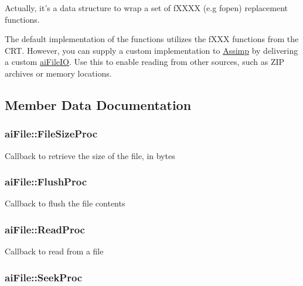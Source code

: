 Actually, it's a data structure to wrap a set of f\-X\-X\-X\-X (e.\-g fopen) replacement functions.

The default implementation of the functions utilizes the f\-X\-X\-X functions from the C\-R\-T. However, you can supply a custom implementation to \hyperlink{namespace_assimp}{Assimp} by delivering a custom \hyperlink{structai_file_i_o}{ai\-File\-I\-O}. Use this to enable reading from other sources, such as Z\-I\-P archives or memory locations. 

\subsection{Member Data Documentation}
\hypertarget{structai_file_aff2fff8c0458e7ec71f7de217c3a3033}{
\subsubsection[{File\-Size\-Proc}]{ ai\-File\-::\-File\-Size\-Proc}}\label{structai_file_aff2fff8c0458e7ec71f7de217c3a3033}
Callback to retrieve the size of the file, in bytes \hypertarget{structai_file_a1102d28d1c0be68ffed20476669bdb0d}{
\subsubsection[{Flush\-Proc}]{ ai\-File\-::\-Flush\-Proc}}\label{structai_file_a1102d28d1c0be68ffed20476669bdb0d}
Callback to flush the file contents \hypertarget{structai_file_a52287e81ca67b9d43cc1ce6142f781fa}{
\subsubsection[{Read\-Proc}]{ ai\-File\-::\-Read\-Proc}}\label{structai_file_a52287e81ca67b9d43cc1ce6142f781fa}
Callback to read from a file \hypertarget{structai_file_a7a07b499be4ad433669246479a4d4ad2}{
\subsubsection[{Seek\-Proc}]{ ai\-File\-::\-Seek\-Proc}}\label{structai_file_a7a07b499be4ad433669246479a4d4ad2}
